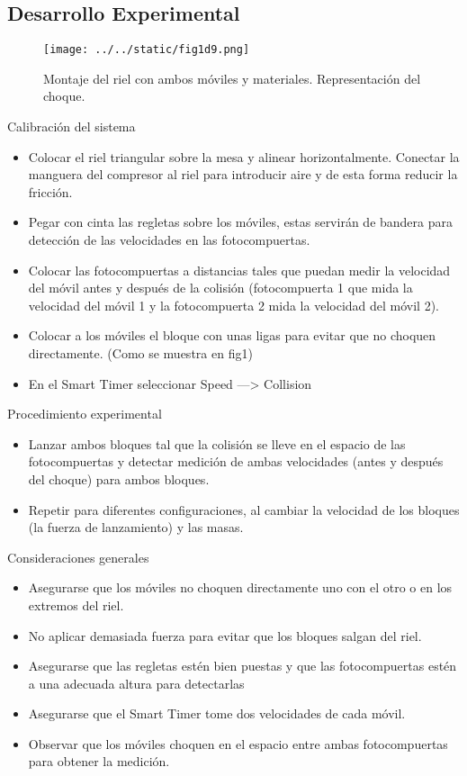 \documentclass{article}
\begin{document}
\begin{multicols}{2}
\section{Desarrollo Experimental}\label{Desarrollo experimental}				%

\begin{figure}[H]
	\centering	
	\texttt{[image: ../../static/fig1d9.png]}
	\caption{Montaje del riel con ambos móviles y materiales. Representación del choque.}
	\label{fig:1}
\end{figure}

Calibración del sistema

\begin{itemize}
\item Colocar el riel triangular sobre la mesa y alinear horizontalmente. Conectar la
manguera del compresor al riel para introducir aire y de esta forma reducir la fricción.
\item Pegar con cinta las regletas sobre los móviles, estas servirán de bandera para
detección de las velocidades en las fotocompuertas.
\item Colocar las fotocompuertas a distancias tales que puedan medir la velocidad del
móvil antes y después de la colisión (fotocompuerta 1 que mida la velocidad del
móvil 1 y la fotocompuerta 2 mida la velocidad del móvil 2).
\item Colocar a los móviles el bloque con unas ligas para evitar que no choquen
directamente. (Como se muestra en fig1) 
\item En el Smart Timer seleccionar Speed —> Collision
\end{itemize}

Procedimiento experimental

\begin{itemize}
\item Lanzar ambos bloques tal que la colisión se lleve en el espacio de las
fotocompuertas y detectar medición de ambas velocidades (antes y después del
choque) para ambos bloques.
\item Repetir para diferentes configuraciones, al cambiar la velocidad de los bloques (la
fuerza de lanzamiento) y las masas.
\end{itemize}

Consideraciones generales

\begin{itemize}
\item Asegurarse que los móviles no choquen directamente uno con el otro o en los
extremos del riel.
\item No aplicar demasiada fuerza para evitar que los bloques salgan del riel.
\item Asegurarse que las regletas estén bien puestas y que las fotocompuertas estén a
una adecuada altura para detectarlas 
\item Asegurarse que el Smart Timer tome dos velocidades de cada móvil.
\item Observar que los móviles choquen en el espacio entre ambas fotocompuertas para
obtener la medición.
\end{itemize}


\end{multicols}
\end{document}
